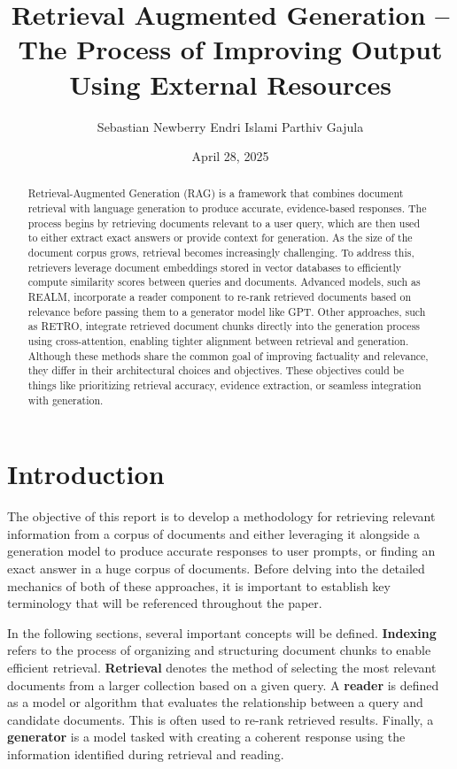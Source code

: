 \documentclass[twocolumn, 10pt]{article}
\title{Retrieval Augmented Generation – The Process of Improving Output Using External Resources}
\author{Sebastian Newberry \quad Endri Islami \quad Parthiv Gajula}
\date{April 28, 2025}
\begin{document}
\maketitle

\begin{abstract}
    Retrieval-Augmented Generation (RAG) is a framework that combines document retrieval with language generation to produce accurate, evidence-based responses. The process begins by retrieving documents relevant to a user query, which are then used to either extract exact answers or provide context for generation. As the size of the document corpus grows, retrieval becomes increasingly challenging. To address this, retrievers leverage document embeddings stored in vector databases to efficiently compute similarity scores between queries and documents. Advanced models, such as REALM, incorporate a reader component to re-rank retrieved documents based on relevance before passing them to a generator model like GPT. Other approaches, such as RETRO, integrate retrieved document chunks directly into the generation process using cross-attention, enabling tighter alignment between retrieval and generation. Although these methods share the common goal of improving factuality and relevance, they differ in their architectural choices and objectives. These objectives could be things like prioritizing retrieval accuracy, evidence extraction, or seamless integration with generation.
\end{abstract}

\section{Introduction}

The objective of this report is to develop a methodology for retrieving relevant information from a corpus of documents and either leveraging it alongside a generation model to produce accurate responses to user prompts, or finding an exact answer in a huge corpus of documents. Before delving into the detailed mechanics of both of these approaches, it is important to establish key terminology that will be referenced throughout the paper.

In the following sections, several important concepts will be defined. \textbf{Indexing} refers to the process of organizing and structuring document chunks to enable efficient retrieval. \textbf{Retrieval} denotes the method of selecting the most relevant documents from a larger collection based on a given query. A \textbf{reader} is defined as a model or algorithm that evaluates the relationship between a query and candidate documents. This is often used to re-rank retrieved results. Finally, a \textbf{generator} is a model tasked with creating a coherent response using the information identified during retrieval and reading.
\end{document}
